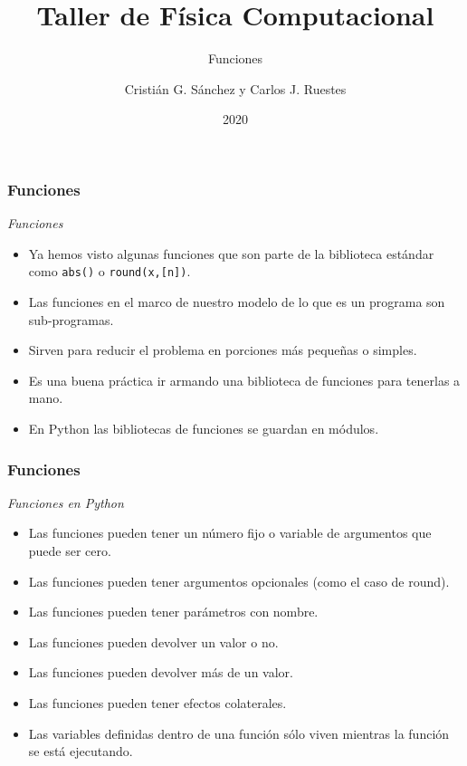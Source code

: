\documentclass{beamer}
\title{Taller de Física Computacional}
\subtitle{Funciones}
\author{Cristián G. Sánchez y Carlos J. Ruestes}
\date{2020}
\begin{document}
\frame{\titlepage}

\begin{frame}[fragile]
\frametitle{Funciones}
\begin{block}{{\em Funciones}}
\begin{itemize}
\item Ya hemos visto algunas funciones que son parte de la biblioteca estándar como  \texttt{abs()} o \texttt{round(x,[n])}.
\item Las funciones en el marco de nuestro modelo de lo que es un programa son sub-programas.
\item Sirven para reducir el problema en porciones más pequeñas o simples.
\item Es una buena práctica ir armando una biblioteca de funciones para tenerlas a mano.
\item En Python las bibliotecas de funciones se guardan en \alert{módulos}.
\end{itemize}
\end{block}
\end{frame}

\begin{frame}[fragile]
\frametitle{Funciones}
\begin{block}{{\em Funciones en Python}}
\begin{itemize}
\item Las funciones pueden tener un número fijo o variable de argumentos que puede ser cero.
\item Las funciones pueden tener argumentos opcionales (como el caso de round).
\item Las funciones pueden tener parámetros con nombre.
\item Las funciones pueden devolver un valor o no.
\item Las funciones pueden devolver más de un valor.
\item Las funciones pueden tener \alert{efectos colaterales}.
\item Las variables definidas dentro de una función sólo viven mientras la función se está ejecutando.
\end{itemize}
\end{block}
\end{frame}
\end{document}
